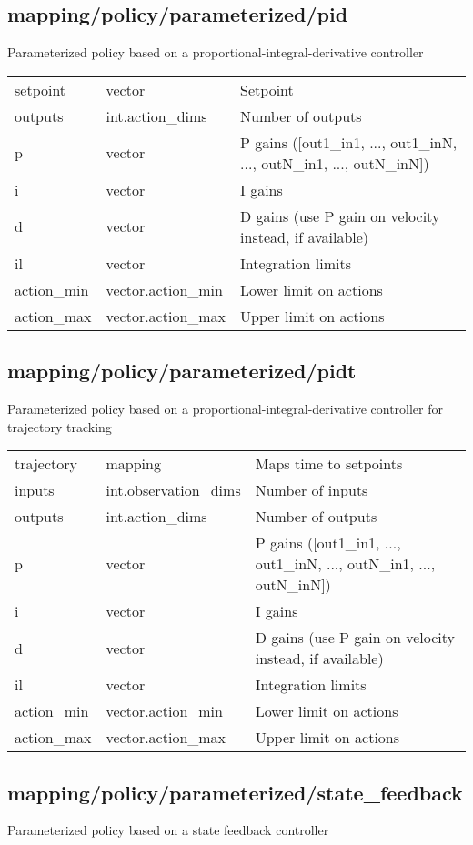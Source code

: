 \subsection{mapping/policy/parameterized/pid}
\noindent Parameterized policy based on a proportional-integral-derivative controller\\

\noindent\begin{tabular}{@{}lll@{}}
setpoint&vector&Setpoint\\
outputs&int.action\_dims&Number of outputs\\
p&vector&P gains ([out1\_in1, ..., out1\_inN, ..., outN\_in1, ..., outN\_inN])\\
i&vector&I gains\\
d&vector&D gains (use P gain on velocity instead, if available)\\
il&vector&Integration limits\\
action\_min&vector.action\_min&Lower limit on actions\\
action\_max&vector.action\_max&Upper limit on actions\\
\end{tabular}
\subsection{mapping/policy/parameterized/pidt}
\noindent Parameterized policy based on a proportional-integral-derivative controller for trajectory tracking\\

\noindent\begin{tabular}{@{}lll@{}}
trajectory&mapping&Maps time to setpoints\\
inputs&int.observation\_dims&Number of inputs\\
outputs&int.action\_dims&Number of outputs\\
p&vector&P gains ([out1\_in1, ..., out1\_inN, ..., outN\_in1, ..., outN\_inN])\\
i&vector&I gains\\
d&vector&D gains (use P gain on velocity instead, if available)\\
il&vector&Integration limits\\
action\_min&vector.action\_min&Lower limit on actions\\
action\_max&vector.action\_max&Upper limit on actions\\
\end{tabular}
\subsection{mapping/policy/parameterized/state\_feedback}
\noindent Parameterized policy based on a state feedback controller\\


